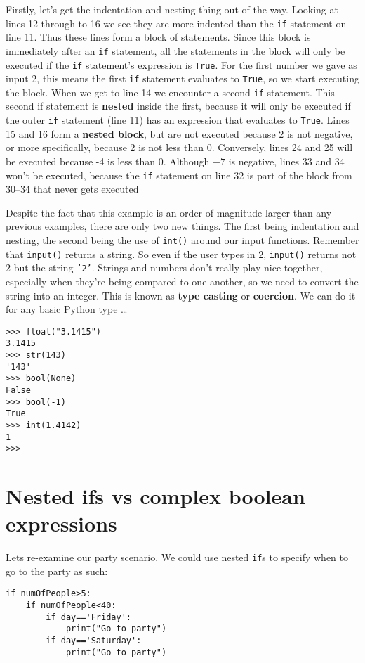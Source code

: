 Firstly, let's get the indentation and nesting thing out of the way.   Looking at lines 12 through to 16 we see they are more indented than   the \texttt{if} statement on line 11. Thus these lines form a block of   statements. Since this block is immediately after an \texttt{if} statement, all   the statements in the block will only be executed if the \texttt{if} statement's   expression is \texttt{True}. For the first number we gave as input 2, this means the first                 \texttt{if} statement evaluates to \texttt{True}, so we start executing the block. When we get to line 14 we   encounter a second \texttt{if} statement. This second if statement is   \textbf{nested} inside the first, because it will only be   executed if the outer \texttt{if} statement (line 11) has an expression that   evaluates to \texttt{True}. Lines 15 and 16 form a \textbf{nested   block}, but are not executed because 2 is not negative, or more   specifically, because 2 is not less than 0. Conversely, lines 24 and 25   will be executed because -4 is less than 0. Although $-7$ is negative, lines 33 and 34 won't be executed, because the \texttt{if} statement on line 32 is part of the block from 30--34 that never gets executed

Despite the fact that this example is an order of magnitude larger   than any previous examples, there are only two new things. The first   being indentation and nesting, the second being the use of   
\texttt{int()} around our input functions.  Remember that   \texttt{input()} returns a string. So even if the user types in 2,   \texttt{input()} returns not 2 but the string \texttt{'2'}. Strings and numbers don't   really play nice together, especially when they're being compared to   one another, so we need to convert the string into an integer. This is   known as \textbf{type casting} or \textbf{coercion}. We   can do it for any basic Python type \ldots
\begin{lstlisting}
>>> float("3.1415")
3.1415
>>> str(143)
'143'
>>> bool(None)
False
>>> bool(-1)
True
>>> int(1.4142)
1
>>>
\end{lstlisting}

\section{Nested ifs vs complex boolean expressions}

 Lets re-examine our party scenario. We could use nested \texttt{if}s to specify when to go to the party as such:
\begin{lstlisting}
if numOfPeople>5:
	if numOfPeople<40:
		if day=='Friday':
			print("Go to party")
		if day=='Saturday':
			print("Go to party")
\end{lstlisting}

